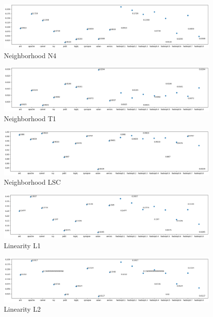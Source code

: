 \begin{figure}[h!]
    \includegraphics[width=\textwidth]{figures/neighborhood-N4.png}
    \caption{Neighborhood N4}
    \label{fig:neighborhood-n4-big}
\end{figure}

\begin{figure}[h!]
    \includegraphics[width=\textwidth]{figures/neighborhood-T1.png}
    \caption{Neighborhood T1}
    \label{fig:neighborhood-t1-big}
\end{figure}

\begin{figure}[h!]
    \includegraphics[width=\textwidth]{figures/neighborhood-LSC.png}
    \caption{Neighborhood LSC}
    \label{fig:neighborhood-lsc-big}
\end{figure}


\begin{figure}[h!]
    \includegraphics[width=\textwidth]{figures/linearity-L1.png}
    \caption{Linearity L1}
    \label{fig:linearity-l1-big}
\end{figure}

\begin{figure}[h!]
    \includegraphics[width=\textwidth]{figures/linearity-L2.png}
    \caption{Linearity L2}
    \label{fig:linearity-l2-big}
\end{figure}


